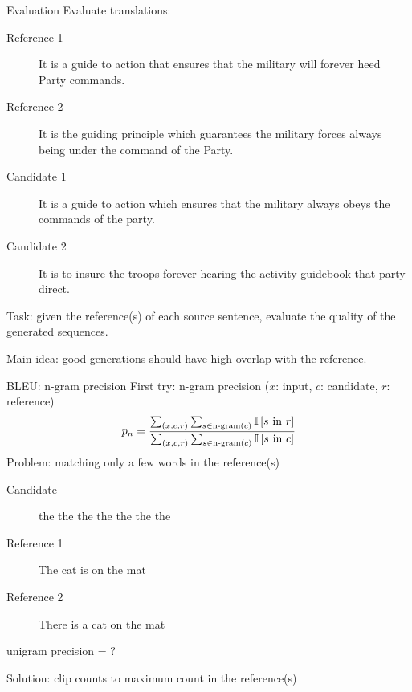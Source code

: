 \documentclass[usenames,dvipsnames,11pt,aspectratio=169]{beamer}
\begin{document}
\begin{frame}
    {Evaluation}
    Evaluate translations:\\
    \begin{description}
        \item[Reference 1] It is a guide to action that ensures that the military will forever heed Party commands.
        \item[Reference 2] It is the guiding principle which guarantees the military forces always being under the command of the Party. 
        \item[Candidate 1] It is a guide to action which ensures that the military always obeys the commands of the party.
        \item[Candidate 2] It is to insure the troops forever hearing the activity guidebook that party direct.
    \end{description}

    {Task}: given the reference(s) of each source sentence, evaluate the quality of the generated sequences.

    {Main idea}: good generations should have high overlap with the reference.
\end{frame}

\begin{frame}
    {BLEU: n-gram precision}
    First try: n-gram precision ($x$: input, $c$: candidate, $r$: reference)
    $$
    p_n = \frac{
        \sum_{(x,c,r)} \sum_{s\in\text{n-gram}(c)} \mathbb{I}\left[ s \text{ in } r \right]
    }
    {
\sum_{(x,c,r)} \sum_{s\in\text{n-gram}(c)} \mathbb{I}\left[ s \text{ in } c \right]
    }
    $$
    \pause
    Problem: matching only a few words in the reference(s)\\
    \begin{description}
        \item[Candidate] the the the the the the the
        \item[Reference 1] The cat is on the mat
        \item[Reference 2] There is a cat on the mat
    \end{description}
    unigram precision = ?

    Solution: clip counts to maximum count in the reference(s)
\end{frame}
\end{document}
